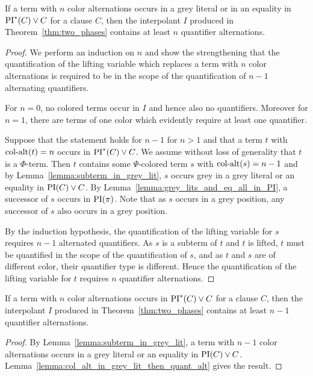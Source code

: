 \documentclass[%
	draft=false,%
	numbers=noendperiod,%
	11pt,%
	a4paper,%
	oneside,%
	openany,%
]{memoir}
\begin{document}
\begin{lemma}
	\label{lemma:col_alt_in_grey_lit_then_quant_alt}
	If a term with $n$ color alternations occurs in a grey literal or in an equality in $\operatorname{PI}^*(C) \lor C$ for a clause $C$, then the interpolant $I$ produced in Theorem~\ref{thm:two_phases} contains at least $n$ quantifier alternations.
\end{lemma}
\begin{proof}
	We perform an induction on $n$
	and show the strengthening that
	the quantification of the lifting variable which replaces a term with $n$ color alternations is required to be in the scope of the quantification of $n-1$ alternating quantifiers.

	For $n=0$, no colored terms occur in $I$ and hence also no quantifiers.
	Moreover for $n=1$, there are terms of one color which evidently require at least one quantifier.

	Suppose that the statement holds for $n-1$ for $n>1$ and that a term $t$ with $\operatorname{col-alt}(t) = n$ occurs in $\operatorname{PI}^*(C) \lor C$.
	We assume without loss of generality that $t$ is a $\Phi$-term.
	Then $t$ contains some $\Psi$-colored term $s$ with $\operatorname{col-alt}(s) = n-1$ and
	by Lemma~\ref{lemma:subterm_in_grey_lit}, $s$ occurs grey in a grey literal or an equality in $\operatorname{PI}(C) \lor C$.
	By Lemma~\ref{lemma:grey_lits_and_eq_all_in_PI}, a successor of $s$ occurs in $\operatorname{PI}(\pi)$. Note that as $s$ occurs in a grey position, any successor of $s$ also occurs in a grey position.

	By the induction hypothesis, the quantification of the lifting variable for $s$ requires $n-1$ alternated quantifiers.
	As $s$ is a subterm of $t$ and $t$ is lifted, $t$ must be quantified in the scope of the quantification of $s$, and as $t$ and $s$ are of different color, their quantifier type is different. 
	Hence the quantification of the lifting variable for $t$ requires $n$ quantifier alternations.
\end{proof}

\begin{lemma}
	\label{lemma:quant_alt_lower_bound}
	If a term with $n$ color alternations occurs in $\operatorname{PI}^*(C) \lor C$ for a clause $C$, then the interpolant $I$ produced in Theorem~\ref{thm:two_phases} contains at least $n-1$ quantifier alternations.
\end{lemma}
\begin{proof}
	By Lemma~\ref{lemma:subterm_in_grey_lit}, a term with $n-1$ color alternations occurs in a grey literal or an equality in $\operatorname{PI}(C) \lor C$.
	Lemma~\ref{lemma:col_alt_in_grey_lit_then_quant_alt} gives the result.
\end{proof}
\end{document}
